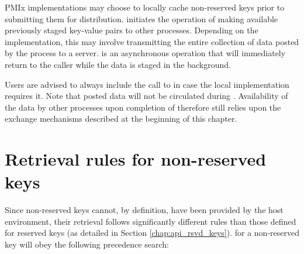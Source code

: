 \descr

\ac{PMIx} implementations may choose to locally cache non-reserved keys prior to submitting them for distribution.   initiates the operation of making available previously staged key-value pairs to other processes.  Depending on the implementation, this may involve transmitting the entire collection of data posted by the process to a server.   is an asynchronous operation that will immediately return to the caller while the data is staged in the background.

\adviceuserstart
Users are advised to always include the call to  in case the local implementation requires it. Note that posted data will not be circulated during . Availability of the data by other processes upon completion of  therefore still relies upon the exchange mechanisms described at the beginning of this chapter.
\adviceuserend


\section{Retrieval rules for non-reserved keys}
\label{chap:data_sharing:retrules}

Since non-reserved keys cannot, by definition, have been provided by the host
environment, their retrieval follows significantly different rules than those
defined for reserved keys (as detailed in Section \ref{chap:api_rsvd_keys}).
 for a non-reserved key will obey the
following precedence search:

